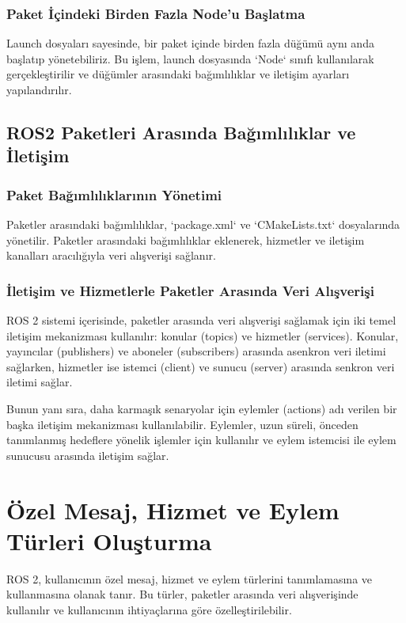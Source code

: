         \subsubsection{Paket İçindeki Birden Fazla Node'u Başlatma}
            Launch dosyaları sayesinde, bir paket içinde birden fazla düğümü aynı anda başlatıp yönetebiliriz. Bu işlem, launch dosyasında `Node` sınıfı kullanılarak gerçekleştirilir ve düğümler arasındaki bağımlılıklar ve iletişim ayarları yapılandırılır.

    \subsection{ROS2 Paketleri Arasında Bağımlılıklar ve İletişim}
        \subsubsection{Paket Bağımlılıklarının Yönetimi}
            Paketler arasındaki bağımlılıklar, `package.xml` ve `CMakeLists.txt` dosyalarında yönetilir. Paketler arasındaki bağımlılıklar eklenerek, hizmetler ve iletişim kanalları aracılığıyla veri alışverişi sağlanır.


            \subsubsection{İletişim ve Hizmetlerle Paketler Arasında Veri Alışverişi}
            ROS 2 sistemi içerisinde, paketler arasında veri alışverişi sağlamak için iki temel iletişim mekanizması kullanılır: konular (topics) ve hizmetler (services). Konular, yayıncılar (publishers) ve aboneler (subscribers) arasında asenkron veri iletimi sağlarken, hizmetler ise istemci (client) ve sunucu (server) arasında senkron veri iletimi sağlar.
            
            Bunun yanı sıra, daha karmaşık senaryolar için eylemler (actions) adı verilen bir başka iletişim mekanizması kullanılabilir. Eylemler, uzun süreli, önceden tanımlanmış hedeflere yönelik işlemler için kullanılır ve eylem istemcisi ile eylem sunucusu arasında iletişim sağlar.
            
            \section{Özel Mesaj, Hizmet ve Eylem Türleri Oluşturma}
            ROS 2, kullanıcının özel mesaj, hizmet ve eylem türlerini tanımlamasına ve kullanmasına olanak tanır. Bu türler, paketler arasında veri alışverişinde kullanılır ve kullanıcının ihtiyaçlarına göre özelleştirilebilir.
            
